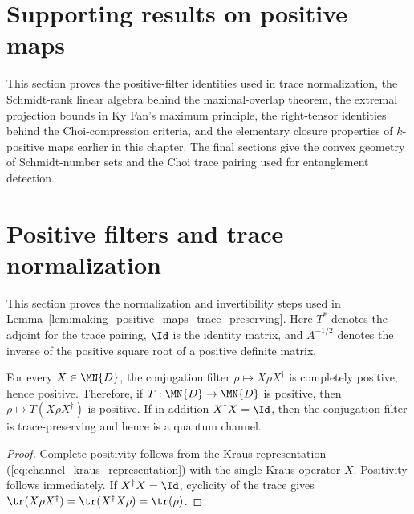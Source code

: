 \section{Supporting results on positive maps}
\label{ch:positive_not_cp_supporting_results}
This section proves the positive-filter identities used in trace
normalization, the Schmidt-rank linear algebra behind the maximal-overlap
theorem, the extremal projection bounds in Ky Fan's maximum principle, the
right-tensor identities behind the Choi-compression criteria, and the
elementary closure properties of $k$-positive maps earlier in this chapter.
The final sections give the convex geometry of Schmidt-number sets and the
Choi trace pairing used for entanglement detection.

\section{Positive filters and trace normalization}

This section proves the normalization and invertibility steps used in
Lemma~\ref{lem:making_positive_maps_trace_preserving}. Here $T^*$ denotes the
adjoint for the trace pairing, $\Id$ is the identity matrix, and $A^{-1/2}$
denotes the inverse of the positive square root of a positive definite matrix.

\begin{theorem}
    \label{thm:conjugation_filters_preserve_positivity}
    \leanok
    For every $X\in\MN{D}$, the conjugation filter
    $\rho\mapsto X\rho X^\dagger$ is completely positive, hence positive.
    Therefore, if $T:\MN{D}\to\MN{D}$ is positive, then
    $\rho\mapsto T(X\rho X^\dagger)$ is positive. If in addition
    $X^\dagger X=\Id$, then the conjugation filter is trace-preserving and
    hence is a quantum channel.
\end{theorem}

\begin{proof}\leanok
    Complete positivity follows from the Kraus representation
    (\ref{eq:channel_kraus_representation}) with the single Kraus operator
    $X$. Positivity follows immediately. If $X^\dagger X=\Id$, cyclicity of
    the trace gives
    $\tr(X\rho X^\dagger)=\tr(X^\dagger X\rho)=\tr(\rho)$.
\end{proof}

